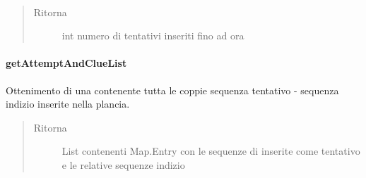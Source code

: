 \documentclass[letterpaper,10pt,italian,openany,oneside]{sphinxmanual}
\begin{document}
\begin{fulllineitems}
\label{\detokenize{test/it/unicam/cs/pa/mastermind/gamecore/BoardModel:it.unicam.cs.pa.mastermind.gamecore.BoardModel.attemptsInserted()}}~\begin{quote}\begin{description}
\item[{Ritorna}] \leavevmode
int numero di tentativi inseriti fino ad ora

\end{description}\end{quote}

\end{fulllineitems}



\paragraph{getAttemptAndClueList}
\label{\detokenize{test/it/unicam/cs/pa/mastermind/gamecore/BoardModel:getattemptandcluelist}}

\begin{fulllineitems}
\label{\detokenize{test/it/unicam/cs/pa/mastermind/gamecore/BoardModel:it.unicam.cs.pa.mastermind.gamecore.BoardModel.getAttemptAndClueList()}}
Ottenimento di una  contenente tutta le coppie sequenza tentativo - sequenza indizio inserite nella plancia.
\begin{quote}\begin{description}
\item[{Ritorna}] \leavevmode
List contenenti Map.Entry con le sequenze di  inserite come tentativo e le relative sequenze indizio

\end{description}\end{quote}

\end{fulllineitems}
\end{document}
